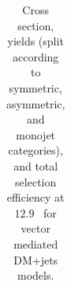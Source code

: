 \begin{table}
{\begin{tabular}{rrlrrrrr}
    \hline\hline
    \end{tabular}
    }
    \caption{Cross section, yields (split according to symmetric, asymmetric, 
        and monojet categories), and total selection efficiency at $12.9$~\ifb 
        for vector mediated DM+jets models.}
    \label{tab:DMV_yld}
\end{table}

